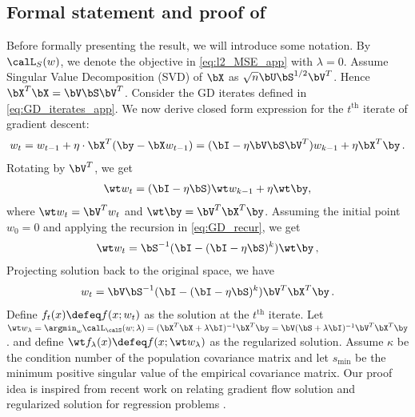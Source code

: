 
\subsection{Formal statement and proof of } \label{app:formal_early_stop}

Before formally presenting the result, 
we will introduce some notation.  
By $\calL_{S}(w)$, we denote 
the objective in \eqref{eq:l2_MSE_app} with $\lambda=0$. 
Assume Singular Value Decomposition (SVD) of $\bX$
as $\sqrt{n} \bU \bS^{1/2} \bV^T$. 
Hence $\bX^T \bX = \bV \bS \bV^T$.
Consider the GD iterates defined in \eqref{eq:GD_iterates_app}. 
% 
We now derive closed form expression 
for the $t^\text{th}$ iterate of gradient descent:  
% 
\begin{align}
    w_t = w_{t-1} + \eta \cdot \bX^T (\by - \bX w_{t-1}) = (\bI - \eta \bV \bS \bV^T )w_{k-1} + \eta \bX^T \by \,.
\end{align}
Rotating by $\bV^T$, we get 
\begin{align}
    \wt w_t = (\bI - \eta\bS )\wt w_{k-1} + \eta \wt \by \label{eq:GD_recur},
\end{align}
where $\wt w_t = \bV^T w_t $ and $\wt \by = \bV^T \bX^T \by$. 
Assuming the initial point $w_0 = 0$ 
and applying the recursion in \eqref{eq:GD_recur}, we get
\begin{align}
    \wt w_t = \bS ^{-1} ( \bI - (\bI - \eta \bS)^k ) \wt \by \,, 
\end{align} 
Projecting solution back to the original space, we have 
\begin{align}
     w_t = \bV \bS ^{-1} ( \bI - (\bI - \eta \bS)^k ) \bV^T \bX^T \by \,. 
\end{align} 
Define $f_t(x) \defeq f(x;w_t)$ 
as the solution at the $t^{\text{th}}$ iterate. 
Let $\wt w_{\lambda} = \argmin_{w} \calL_\calS (w;\lambda) = (\bX^T \bX + \lambda \bI)^{-1} \bX^T \by = \bV (\bS + \lambda \bI )^{-1} \bV^T \bX^T \by $. 
and define $\wt f_\lambda(x) \defeq f(x;\wt w_\lambda)$ as the regularized solution. 
Assume $\kappa$ be the condition number 
of the population covariance matrix 
and let $s_\text{min}$ be the minimum positive 
singular value of the empirical covariance matrix. 
Our proof idea is inspired from recent work 
on relating gradient flow solution 
and regularized solution 
for regression problems \citep{ali2018continuous}. 
